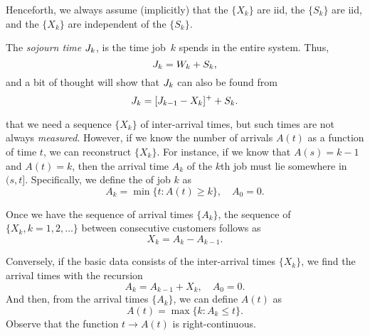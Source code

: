 Henceforth, we always assume (implicitly) that the $\{X_k\}$ are iid, the $\{S_k\}$ are iid, and the $\{X_k\}$ are independent of the $\{S_k\}$.


The \emph{sojourn time} $J_k$, is the time  job~$k$ spends in the entire system. Thus,
\begin{equation*}
 J_k = W_{k} + S_k,
\end{equation*}
and a bit of thought will show that $J_k$ can also be found from
\begin{equation}
\label{eq:59}
J_{k} = [J_{k-1} - X_k]^+ + S_k.
\end{equation}


 that we need a sequence $\{X_k\}$ of inter-arrival times, but such times are not always \emph{measured}.
However, if we know the number of arrivals $A(t)$ as a function of time $t$, we can reconstruct $\{X_k\}$.
For instance, if we know that $A(s) = k-1$ and $A(t) = k$, then the arrival time $A_k$ of the $k$th job must lie somewhere in $(s,t]$.
Specifically, we define the  of job $k$ as
\begin{equation*}
 A_k = \min\{t: A(t) \geq k\}, \quad A_0 = 0.
\end{equation*}


Once we have the sequence of arrival times $\{A_k\}$, the sequence of  $\{X_k, k=1, 2, \ldots\}$ between consecutive customers follows as
\begin{equation*}
 X_k = A_k - A_{k-1}.
\end{equation*}

Conversely, if the basic data consists of the inter-arrival times $\{X_k\}$, we find the arrival times with the recursion
\begin{equation}\label{eq:29}
 A_k = A_{k-1} + X_k, \quad A_0 = 0.
\end{equation}
And then, from the  arrival times $\{A_k\}$, we can define  $A(t)$ as 
\begin{equation} \label{eq:2}
 A(t) = \max\{k: A_k \leq t\}.
\end{equation}
Observe that the function $t\to A(t)$ is right-continuous.

